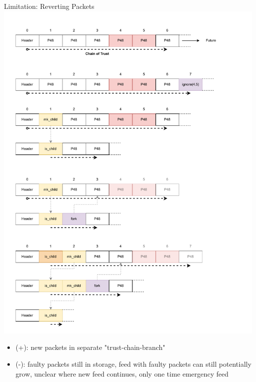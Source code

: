 \documentclass[aspectratio=169]{beamer}
\begin{document}
\begin{frame}[c]{Limitation: Reverting Packets}
        \includegraphics[width=1\textwidth]{images/fork_3.pdf}
        \begin{itemize}
        		\item (+): new packets in separate "trust-chain-branch"
		\item (-): faulty packets still in storage, feed with faulty packets can still potentially grow, unclear where new feed continues, only one time emergency feed
	\end{itemize}
\end{frame}
\end{document}
